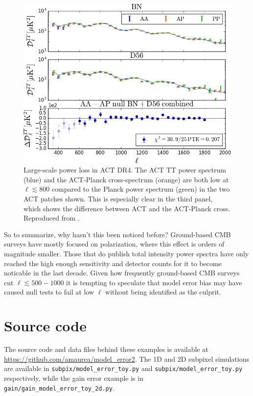 \documentclass{aa}
\begin{document}
\begin{figure}[ht]
	\centering
	\includegraphics[width=\columnwidth]{act_dr4_tf.png}
	\caption{Large-scale power loss in ACT DR4. The ACT TT power spectrum (blue)
	and the ACT-Planck cross-spectrum (orange) are both low at $\ell \lesssim 800$
	compared to the Planck power spectrum (green) in the two ACT patches shown.
	This is especially clear in the third panel, which shows the difference between
	ACT and the ACT-Planck cross. Reproduced from \citet{choi/etal:2020}.}
	\label{fig:act-dr4-tf}
\end{figure}

So to summarize, why hasn't this been noticed before? Ground-based CMB surveys
have mostly focused on polarization, where this effect is orders of magnitude
smaller. Those that do publish total intensity power spectra
have only reached the high enough sensitivity and detector counts for it to
become noticable in the last decade. Given how frequently ground-based CMB
surveys cut $\ell \lesssim 500-1000$ it is tempting to speculate that model error
bias may have caused null tests to fail at low $\ell$ without being
identified as the culprit.

\section{Source code}
\label{sec:code}
The source code and data files behind these examples is available at
\url{https://github.com/amaurea/model_error2}. The 1D and 2D subpixel
simulations are available in \verb|subpix/model_error_toy.py| and \verb|subpix/model_error_toy.py|
respectively, while the gain error example is in
\verb|gain/gain_model_error_toy_2d.py|.
\end{document}
